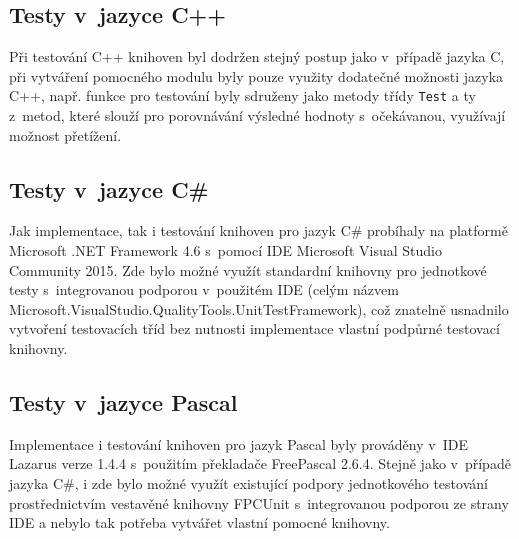 \documentclass[czech,BP]{thesiskiv}
\begin{document}
\subsection{Testy v~jazyce C++}
Při testování C++ knihoven byl dodržen stejný postup jako v~případě jazyka C, při vytváření pomocného modulu byly pouze využity dodatečné možnosti jazyka C++, např. funkce pro testování byly sdruženy jako metody třídy \texttt{Test} a ty z~metod, které slouží pro porovnávání výsledné hodnoty s~očekávanou, využívají možnost přetížení.

\subsection{Testy v~jazyce C\#}
Jak implementace, tak i testování knihoven pro jazyk C\# probíhaly na platformě Microsoft .NET Framework 4.6 s~pomocí IDE Microsoft Visual Studio Community 2015. Zde bylo možné využít standardní knihovny pro jednotkové testy s~integrovanou podporou v~použitém IDE (celým názvem Microsoft.VisualStudio.QualityTools.UnitTestFramework), což znatelně usnadnilo vytvoření testovacích tříd bez nutnosti implementace vlastní podpůrné testovací knihovny.

\subsection{Testy v~jazyce Pascal}
Implementace i testování knihoven pro jazyk Pascal byly prováděny v~IDE Lazarus verze 1.4.4 s~použitím překladače FreePascal 2.6.4. Stejně jako v~případě jazyka C\#, i zde bylo možné využít existující podpory jednotkového testování prostřednictvím vestavěné knihovny FPCUnit s~integrovanou podporou ze strany IDE a nebylo tak potřeba vytvářet vlastní pomocné knihovny.
\end{document}
